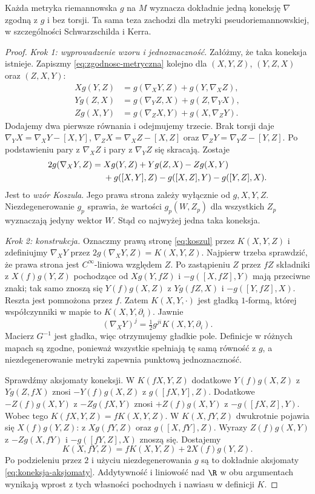 \begin{twierdzenie}
\label{thm:levi-civita}
Każda metryka riemannowska $g$ na $M$ wyznacza
dokładnie jedną koneksję $\nabla$ zgodną z $g$
i bez torsji. Ta sama teza zachodzi dla metryki
pseudoriemannowskiej, w szczególności
Schwarzschilda i Kerra.
\end{twierdzenie}
\begin{proof}
\emph{Krok 1: wyprowadzenie wzoru i jednoznaczność.}
Załóżmy, że taka koneksja istnieje. Zapiszmy
\eqref{eq:zgodnosc-metryczna} kolejno dla
$(X,Y,Z)$, $(Y,Z,X)$ oraz $(Z,X,Y)$:
\begin{align*}
 Xg(Y,Z)&=g(\nabla_XY,Z)+g(Y,\nabla_XZ),\\
 Yg(Z,X)&=g(\nabla_YZ,X)+g(Z,\nabla_YX),\\
 Zg(X,Y)&=g(\nabla_ZX,Y)+g(X,\nabla_ZY).
\end{align*}
Dodajemy dwa pierwsze równania i odejmujemy
trzecie. Brak torsji daje
$\nabla_YX=\nabla_XY-[X,Y]$,
$\nabla_ZX=\nabla_XZ-[X,Z]$ oraz
$\nabla_ZY=\nabla_YZ-[Y,Z]$.
Po podstawieniu pary z $\nabla_XZ$ i pary
z $\nabla_YZ$ się skracają. Zostaje
\begin{align}\label{eq:koszul}
2g(\nabla_XY,Z)={}&Xg(Y,Z)+Yg(Z,X)-Zg(X,Y)\notag\\
 &+g([X,Y],Z)-g([X,Z],Y)-g([Y,Z],X).
\end{align}
Jest to \emph{wzór Koszula}. Jego prawa strona
zależy wyłącznie od $g,X,Y,Z$. Niezdegenerowanie
$g_p$ sprawia, że wartości $g_p(W,Z_p)$ dla
wszystkich $Z_p$ wyznaczają jedyny wektor $W$.
Stąd co najwyżej jedna taka koneksja.

\emph{Krok 2: konstrukcja.} Oznaczmy prawą stronę
\eqref{eq:koszul} przez $K(X,Y,Z)$ i zdefiniujmy
$\nabla_XY$ przez $2g(\nabla_XY,Z)=K(X,Y,Z)$.
Najpierw trzeba sprawdzić, że prawa strona
jest $C^\infty$-liniowa względem $Z$.
Po zastąpieniu $Z$ przez $fZ$ składniki z
$X(f)g(Y,Z)$ pochodzące od
$Xg(Y,fZ)$ i $-g([X,fZ],Y)$ mają przeciwne znaki;
tak samo znoszą się $Y(f)g(X,Z)$ z
$Yg(fZ,X)$ i $-g([Y,fZ],X)$.
Reszta jest pomnożona przez $f$.
Zatem $K(X,Y,\cdot)$ jest gładką $1$-formą,
której współczynniki w mapie to $K(X,Y,\partial_i)$.
Jawnie
\[
 (\nabla_XY)^j=\tfrac12g^{ji}K(X,Y,\partial_i).
\]
Macierz $G^{-1}$ jest gładka, więc otrzymujemy gładkie pole.
Definicje w różnych mapach są zgodne, ponieważ wszystkie
spełniają tę samą równość z $g$, a niezdegenerowanie
metryki zapewnia punktową jednoznaczność.

Sprawdźmy aksjomaty koneksji. W $K(fX,Y,Z)$
dodatkowe $Y(f)g(X,Z)$ z $Yg(Z,fX)$
znosi $-Y(f)g(X,Z)$ z $g([fX,Y],Z)$.
Dodatkowe $-Z(f)g(X,Y)$ z $-Zg(fX,Y)$
znosi $+Z(f)g(X,Y)$ z $-g([fX,Z],Y)$.
Wobec tego $K(fX,Y,Z)=fK(X,Y,Z)$.
W $K(X,fY,Z)$ dwukrotnie pojawia się
$X(f)g(Y,Z)$: z $Xg(fY,Z)$ oraz
$g([X,fY],Z)$. Wyrazy $Z(f)g(X,Y)$
z $-Zg(X,fY)$ i $-g([fY,Z],X)$
znoszą się. Dostajemy
\[
 K(X,fY,Z)=fK(X,Y,Z)+2X(f)g(Y,Z).
\]
Po podzieleniu przez $2$ i użyciu
niezdegenerowania $g$ są to dokładnie
aksjomaty \eqref{eq:koneksja-aksjomaty}.
Addytywność i liniowość nad $\R$ w obu argumentach
wynikają wprost z tych własności pochodnych i nawiasu
w definicji $K$.


\end{proof}
